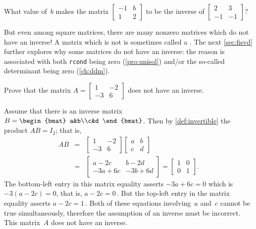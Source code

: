 \begin{activity}
What value of~\(b\) makes the matrix \(\begin{bmatrix} -1&b\\1&2 \end{bmatrix}\) to be the inverse of
\(\begin{bmatrix} 2&3\\-1&-1 \end{bmatrix}\)?
\end{activity}





But even among square matrices, there are many nonzero matrices which do not have an inverse!
A matrix which is not  is sometimes called a .
The next \cref{sec:fisvd} further explores why some matrices do not have an inverse: the reason is associated with both \verb|rcond| being zero (\cref{pro:unisol}) and/or the so-called determinant being zero (\cref{ch:ddm}).

\begin{example}[no inverse] \label{eg:no2x2inv}
Prove that the matrix
\(A=\begin{bmatrix} 1&-2\\-3&6 \end{bmatrix}\)
does not have an inverse.
\begin{solution} 
Assume that there is an inverse matrix
\(B=\begin{bmat} a&b\\c&d \end{bmat}\).
Then by \cref{def:invertible} the product \(AB=I_2\); that is,
\begin{eqnarray*}
AB&=&\begin{bmatrix} 1&-2\\-3&6 \end{bmatrix}
\begin{bmatrix} a&b\\c&d \end{bmatrix}
\\&=&\begin{bmatrix} a-2c&b-2d\\-3a+6c&-3b+6d \end{bmatrix}
=\begin{bmatrix} 1&0\\0&1 \end{bmatrix}.
\end{eqnarray*}
The bottom-left entry in this matrix equality asserts \(-3a+6c=0\) which is \(-3(a-2c)=0\), that is, \(a-2c=0\)\,.
But the top-left entry in the matrix equality asserts \(a-2c=1\)\,.
Both of these equations involving~\(a\) and~\(c\) cannot be true simultaneously, therefore the assumption of an inverse must be incorrect.
This matrix~\(A\) does not have an inverse.
\end{solution}
\end{example}



